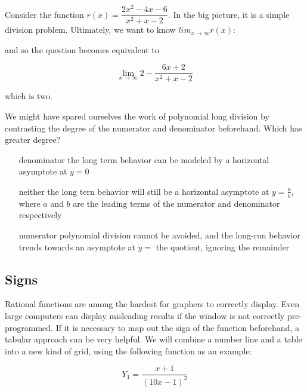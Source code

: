 Consider the function $r(x) = \dfrac{2x^2-4x-6}{x^2+x-2}$.  In the big picture, 
it is a simple division problem.  Ultimately, we want to know $lim_{x\rightarrow\infty} 
r(x)$:


and so the question becomes equivalent to 

$$
\lim_{x\rightarrow\infty} 2-\frac{6x+2}{x^2+x-2}
$$

which is two.

We might have spared ourselves the work of polynomial long division by contrasting the degree
of the numerator and denominator beforehand.  Which has greater degree?
\begin{itemize}
\item[denominator] the long term behavior can be modeled by a horizontal asymptote at $y=0$
\item[neither] the long tern behavior will still be a horizontal asymptote at $y=\frac{a}{b}$, where $a$ and $b$ are the leading terms of the numerator and denominator respectively
\item[numerator] polynomial division cannot be avoided, and the long-run behavior trends towards an asymptote at $y=$ the quotient, ignoring the remainder
\end{itemize}

\subsection{Signs}
Rational functions are among the hardest for graphers to correctly display.  
Even large computers can display misleading results if the window is not correctly 
pre-programmed.  If it is necessary to map out the sign of the function beforehand,
a tabular approach can be very helpful.  We will combine a number line and a table
into a new kind of grid, using the following function as an example:

$$Y_1=\frac{x+1}{(10x-1)^2}$$

